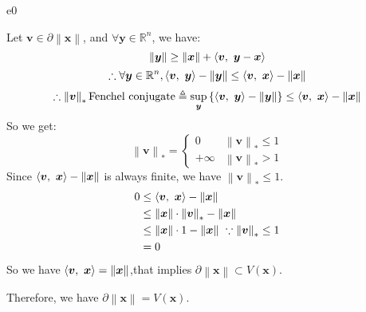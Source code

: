 \documentclass{article}
\newcommand{\xB}{\bm{x}}
\newcommand{\yB}{\bm{y}}
\newcommand{\vB}{\bm{v}}
\newcommand{\RBB}{\mathbb{R}}
\newcommand{\normgen}[1]{\left\| #1 \right\|}
\begin{document}
\begin{PROOF}{e0}
\begin{enumerate}
		Let $\vB \in \partial \normgen{\xB}$, and $\forall \yB \in \RBB^n$, we have:
		\begin{equation}
			\normgen{\yB} \geq \normgen{\xB} + \innerproduct{\vB}{\yB-\xB}
		\end{equation}
		\begin{equation}
			\therefore \forall \yB \in \RBB^n, \innerproduct{\vB}{\yB} - \normgen{\yB} \leq \innerproduct{\vB}{\xB} - \normgen{\xB}
		\end{equation}
		\begin{equation}
			\therefore \normgen{\vB}_* \text{Fenchel conjugate} \triangleq  \sup_{\yB} \left\{  \innerproduct{\vB}{\yB} -\normgen{\yB}\right\} \leq \innerproduct{\vB}{\xB} - \normgen{\xB}
		\end{equation}
		So we get:
		\begin{equation}
			\normgen{\vB}_* = \begin{cases}
				0&\normgen{\vB}_* \leq 1\\
				+\infty&\normgen{\vB}_* > 1
			\end{cases}
		\end{equation}
		Since $\innerproduct{\vB}{\xB}-\normgen{\xB}$ is always finite, we have $\normgen{\vB}_* \leq 1$.
		\begin{align}
			0 &\leq \innerproduct{\vB}{\xB} - \normgen{\xB} \\
			&\leq \normgen{\xB} \cdot \normgen{\vB}_* -\normgen{\xB}\\
			&\leq \normgen{\xB} \cdot 1 -\normgen{\xB}\  \because \normgen{\vB}_* \leq 1\\
			&= 0
		\end{align}
		So we have $\innerproduct{\vB}{\xB} = \normgen{\xB}$,that implies $\partial \normgen{\xB}\subset V(\xB)$.
	\end{enumerate}
	Therefore, we have $\partial \normgen{\xB} = V(\xB)$.

\end{PROOF}
\end{document}
